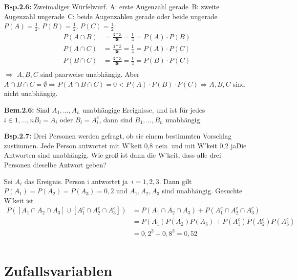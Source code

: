 \documentclass[a4paper,11pt]{article}
\begin{document}
\vspace{6pt}
\noindent\textbf{Bsp.2.6:} Zweimaliger Würfelwurf.
\newline A: \glqq erste Augenzahl gerade\grqq\ 
\newline B: \glqq zweite Augenzahl ungerade\grqq\
\newline C: \glqq beide Augenzahlen gerade oder beide ungerade\grqq\
\newline $P(A)=\frac{1}{2}$, $P(B)=\frac{1}{2}$, $P(C)=\frac{1}{2}$: 
\begin{align*}
P(A\cap B) &= \frac{3*3}{36}=\frac{1}{4}=P(A)\cdot P(B)\\
P(A\cap C) &= \frac{3*3}{36}=\frac{1}{4}=P(A)\cdot P(C)\\
P(B\cap C) &= \frac{3*3}{36}=\frac{1}{4}=P(B)\cdot P(C)\\
\end{align*}
\newline $\Rightarrow$ $A,B,C$ sind paarweise unabhängig. Aber $A\cap B\cap C=\emptyset \Rightarrow P(A\cap B\cap C)=0<P(A)\cdot P(B)\cdot P(C) \Rightarrow A,B,C$ sind nicht unabhängig.

\vspace{6pt}
\noindent\textbf{Bem.2.6:} Sind $A_1,\dots,A_n$ unabhängige Ereignisse, und ist für jedes $i\in{1,\dots,n} B_i=A_i$ oder $B_i=A_i^c$, dann sind $B_1,\dots,B_n$ unabhängig.

\vspace{6pt}
\noindent\textbf{Bsp.2.7:} Drei Personen werden gefragt, ob sie einem bestimmten Vorschlag zustimmen. Jede Person antwortet mit W'keit 0,8 \glqq nein\grqq\ und mit W'keit 0,2 \glqq ja\grqq\.
Die Antworten sind unabhängig. Wie groß ist dann die W'keit, dass alle drei Personen dieselbe Antwort geben?

\vspace{4pt}
\noindent Sei $A_i$ das Ereignis. Person i antwortet \glqq ja\grqq\, $i=1,2,3$. Dann gilt $P(A_1)=P(A_2)=P(A_3)=0,2$ und $A_1,A_2,A_3$ sind unabhängig. 
\newline Gesuchte W'keit ist 
\begin{align*}
P([A_1\cap A_2 \cap A_3] \cup [A_1^c \cap A_2^c \cap A_3^c]) &= P(A_1\cap A_2 \cap A_3)+P(A_1^c \cap A_2^c \cap A_3^c)\\ 
&= P(A_1)P(A_2)P(A_3)+P(A_1^c)P(A_2^c)P(A_3^c)\\
&= 0,2^3+0,8^3=0,52\\
\end{align*}

\section{Zufallsvariablen}
\end{document}
